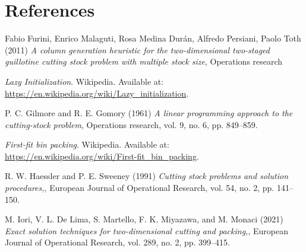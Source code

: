 \documentclass[a4paper]{article}
\begin{document}
\section{References}
\renewcommand{\refname}{} %
\begin{thebibliography}{60}
\setlength{\itemsep}{0pt}    %
\setlength{\parsep}{0pt}     %

Fabio Furini, Enrico Malaguti, Rosa Medina Durán, Alfredo Persiani, Paolo Toth (2011) \emph{A column generation heuristic for the two-dimensional two-staged guillotine cutting stock problem with multiple stock size}, Operations research

\textit{Lazy Initialization}. Wikipedia. Available at: \url{https://en.wikipedia.org/wiki/Lazy_initialization}.

P. C. Gilmore and R. E. Gomory (1961) \emph{A linear programming approach to the cutting-stock problem}, Operations research, vol. 9, no. 6, pp. 849–859.

\textit{First-fit bin packing}. Wikipedia. Available at: \url{https://en.wikipedia.org/wiki/First-fit_bin_packing}.

R. W. Haessler and P. E. Sweeney (1991) \emph{Cutting stock problems and solution procedures,}, European Journal of Operational Research, vol. 54, no. 2, pp. 141–150.

M. Iori, V. L. De Lima, S. Martello, F. K. Miyazawa, and M. Monaci (2021) \emph{Exact solution techniques for two-dimensional cutting and packing,}, European Journal of Operational Research, vol. 289,
no. 2, pp. 399–415.

\end{thebibliography}
\end{document}
